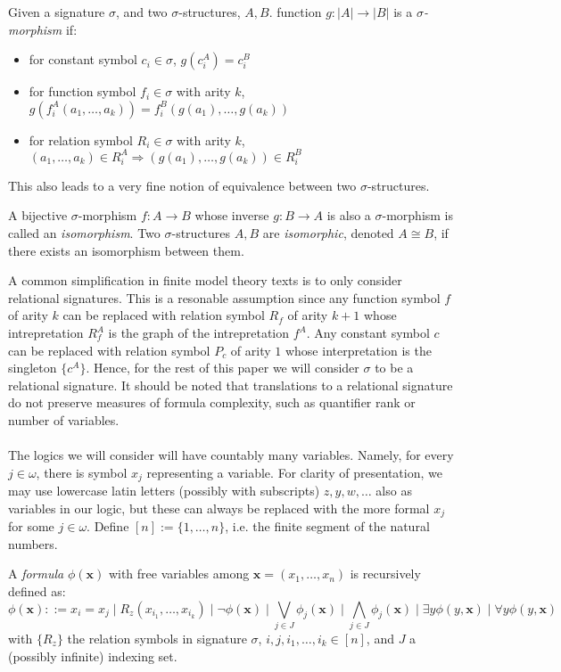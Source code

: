 \begin{defn}
Given a signature $\sigma$, and two $\sigma$-structures, $A,B$. function $g:|A| \longrightarrow |B|$ is a \textit{$\sigma$-morphism} if: 
\begin{itemize}
    \item for constant symbol $c_{i} \in \sigma$, $g(c_{i}^{A}) = c_{i}^{B}$
    \item for function symbol $f_{i} \in \sigma$ with arity $k$, $g(f_{i}^{A}(a_{1},\dots,a_{k})) = f_{i}^{B}(g(a_{1}),\dots,g(a_{k}))$
    \item for relation symbol $R_{i} \in \sigma$ with arity $k$, $(a_{1},\dots,a_{k}) \in R_{i}^{A} \Rightarrow (g(a_{1}),\dots,g(a_{k})) \in R_{i}^{B}$
\end{itemize}
\end{defn}
This also leads to a very fine notion of equivalence between two $\sigma$-structures. 
\begin{defn}
A bijective $\sigma$-morphism $f:A \longrightarrow B$ whose inverse $g:B \longrightarrow A$ is also a $\sigma$-morphism is called an \textit{isomorphism}. Two $\sigma$-structures $A,B$ are \textit{isomorphic}, denoted $A \cong B$, if there exists an isomorphism between them. 
\end{defn}
A common simplification in finite model theory texts is to only consider relational signatures. This is a resonable assumption since any function symbol $f$ of arity $k$ can be replaced with relation symbol $R_{f}$ of arity $k+1$ whose intrepretation $R^{A}_{f}$ is the graph of the intrepretation $f^{A}$. Any constant symbol $c$ can be replaced with relation symbol $P_{c}$ of arity $1$ whose interpretation is the singleton $\{c^{A}\}$. Hence, for the rest of this paper we will consider $\sigma$ to be a relational signature.  It should be noted that translations to a relational signature do not preserve measures of formula complexity, such as quantifier rank or number of variables. \\~\\
 The logics we will consider will have countably many variables. Namely, for every $j \in \omega$, there is symbol $x_{j}$ representing a variable. For clarity of presentation, we may use lowercase latin letters (possibly with subscripts) $z,y,w,\dots$ also as variables in our logic, but these can always be replaced with the more formal $x_{j}$ for some $j \in \omega$. Define $[n] := \{1,\dots,n\}$, i.e. the finite segment of the natural numbers.   
\begin{defn}
A \textit{formula} $\phi(\mathbf{x})$ with free variables among $\mathbf{x} = (x_{1},\dots,x_{n})$ is recursively defined as: 
$$ \phi(\mathbf{x}) ::= x_{i} = x_{j} \mid R_{z}(x_{i_{1}},\dots,x_{i_{k}}) \mid \neg \phi(\mathbf{x}) \mid \bigvee_{j \in J} \phi_{j}(\mathbf{x}) \mid \bigwedge_{j \in J} \phi_{j}(\mathbf{x}) \mid \exists y \phi(y,\mathbf{x}) \mid \forall y \phi(y,\mathbf{x})$$
with $\{R_{z}\}$ the relation symbols in signature $\sigma$, $i,j,i_{1},\dots,i_{k} \in [n]$, and $J$ a (possibly infinite) indexing set.  
\label{defn:formula}
\end{defn}
